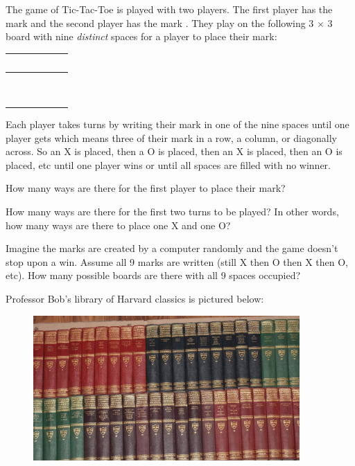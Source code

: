 \documentclass[12pt]{article}
\begin{document}
\eenum

\problem The game of Tic-Tac-Toe is played with two players. The first player has the mark  and the second player has the mark . They play on the following 3 $\times  $ 3 board with nine \emph{distinct} spaces for a player to place their mark:

\begin{table}[htp]
\centering
\Huge
\begin{tabular}{c|c|c}
  ~~ & ~~ & ~~ \\      \hline
  ~~ & ~~ & ~~ \\      \hline
  ~~ & ~~ & ~~
\end{tabular}
\end{table}

\noindent Each player takes turns by writing their mark in one of the nine spaces until one player gets  which means three of their mark in a row, a column, or diagonally across. So an X is placed, then a O is placed, then an X is placed, then an O is placed, etc until one player wins or until all spaces are filled with no winner.

\benum
{} How many ways are there for the first player to place their mark? 

 How many ways are there for the first two turns to be played? In other words, how many ways are there to place one X and one O? 

 Imagine the marks are created by a computer randomly and the game doesn't stop upon a win. Assume all 9 marks are written (still X then O then X then O, etc). How many possible boards are there with all 9 spaces occupied? 

\eenum

\problem Professor Bob's library of Harvard classics is pictured below:

\begin{figure}[htp]
\centering
\includegraphics[width=4in]{books.png}
\end{figure}
\end{document}

